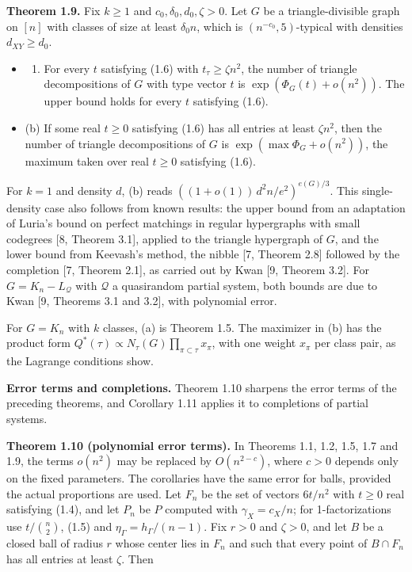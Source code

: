 \documentclass[english,11pt,a4paper]{article}
\providecommand{\tightlist}{\setlength{\itemsep}{0pt}\setlength{\parskip}{0pt}}
\begin{document}
\textbf{Theorem 1.9.} Fix \(k\ge1\) and \(c_0,\delta_0,d_0,\zeta>0\). Let \(G\) be a triangle-divisible graph on \([n]\) with classes of size at least \(\delta_0 n\), which is \((n^{-c_0},5)\)-typical with densities \(d_{XY}\ge d_0\).

\begin{itemize}
\tightlist
\item
  \begin{enumerate}
  \def\labelenumi{(\alph{enumi})}
  \tightlist
  \item
    For every \(t\) satisfying (1.6) with \(t_\tau\ge\zeta n^2\), the number of triangle decompositions of \(G\) with type vector \(t\) is \(\exp(\Phi_G(t)+o(n^2))\). The upper bound holds for every \(t\) satisfying (1.6).
  \end{enumerate}
\item
  (b) If some real \(t\ge0\) satisfying (1.6) has all entries at least \(\zeta n^2\), then the number of triangle decompositions of \(G\) is \(\exp(\max\Phi_G+o(n^2))\), the maximum taken over real \(t\ge0\) satisfying (1.6).
\end{itemize}

For \(k=1\) and density \(d\), (b) reads \(((1+o(1))\,d^2n/e^2)^{e(G)/3}\). This single-density case also follows from known results: the upper bound from an adaptation of Luria's bound on perfect matchings in regular hypergraphs with small codegrees {[}8, Theorem 3.1{]}, applied to the triangle hypergraph of \(G\), and the lower bound from Keevash's method, the nibble {[}7, Theorem 2.8{]} followed by the completion {[}7, Theorem 2.1{]}, as carried out by Kwan {[}9, Theorem 3.2{]}. For \(G=K_n-L_{\mathcal Q}\) with \(\mathcal Q\) a quasirandom partial system, both bounds are due to Kwan {[}9, Theorems 3.1 and 3.2{]}, with polynomial error.

For \(G=K_n\) with \(k\) classes, (a) is Theorem 1.5. The maximizer in (b) has the product form \(Q^*(\tau)\propto N_\tau(G)\prod_{\pi\subset\tau}x_\pi\), with one weight \(x_\pi\) per class pair, as the Lagrange conditions show.

\textbf{Error terms and completions.} Theorem 1.10 sharpens the error terms of the preceding theorems, and Corollary 1.11 applies it to completions of partial systems.

\textbf{Theorem 1.10 (polynomial error terms).} In Theorems 1.1, 1.2, 1.5, 1.7 and 1.9, the terms \(o(n^2)\) may be replaced by \(O(n^{2-c})\), where \(c>0\) depends only on the fixed parameters. The corollaries have the same error for balls, provided the actual proportions are used. Let \(F_n\) be the set of vectors \(6t/n^2\) with \(t\ge0\) real satisfying (1.4), and let \(P_n\) be \(P\) computed with \(\gamma_X=c_X/n\); for 1-factorizations use \(t/\binom n2\), (1.5) and \(\eta_\Gamma=h_\Gamma/(n-1)\). Fix \(r>0\) and \(\zeta>0\), and let \(B\) be a closed ball of radius \(r\) whose center lies in \(F_n\) and such that every point of \(B\cap F_n\) has all entries at least \(\zeta\). Then
\end{document}
